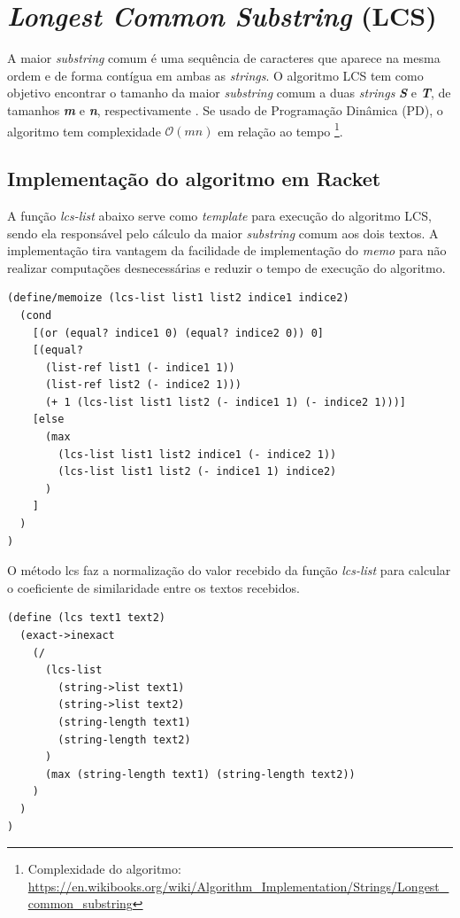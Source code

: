 \documentclass[12pt]{article}
\begin{document}
\newpage

\section{\textit{Longest Common Substring} (LCS)}\label{sec:lcs}

A maior \textit{substring} comum é uma sequência de caracteres que aparece na mesma ordem e de forma contígua em ambas as \textit{strings}. O algoritmo LCS tem como objetivo encontrar o tamanho da maior \textit{substring} comum a duas \textit{strings} \textbf{\textit{S}} e \textbf{\textit{T}}, de tamanhos \textbf{\textit{m}} e \textbf{\textit{n}}, respectivamente \cite{Amir2018LongestCS}. Se usado de Programação Dinâmica (PD), o algoritmo tem complexidade $\mathcal{O}(mn)$ em relação ao tempo \footnote{Complexidade do algoritmo: \url{https://en.wikibooks.org/wiki/Algorithm_Implementation/Strings/Longest_common_substring}}.

\subsection{Implementação do algoritmo em Racket}

A função \textit{lcs-list} abaixo serve como \textit{template} para execução do algoritmo LCS, sendo ela responsável pelo cálculo da maior \textit{substring} comum aos dois textos. A implementação tira vantagem da facilidade de implementação do \textit{memo} para não realizar computações desnecessárias e reduzir o tempo de execução do algoritmo.

\begin{lstlisting}
(define/memoize (lcs-list list1 list2 indice1 indice2)
  (cond 
    [(or (equal? indice1 0) (equal? indice2 0)) 0]
    [(equal? 
      (list-ref list1 (- indice1 1))
      (list-ref list2 (- indice2 1)))
      (+ 1 (lcs-list list1 list2 (- indice1 1) (- indice2 1)))]
    [else
      (max
        (lcs-list list1 list2 indice1 (- indice2 1))
        (lcs-list list1 list2 (- indice1 1) indice2)
      )
    ]
  )
)
\end{lstlisting}

O método lcs faz a normalização do valor recebido da função \textit{lcs-list} para calcular o coeficiente de similaridade entre os textos recebidos.

\begin{lstlisting}
(define (lcs text1 text2)
  (exact->inexact 
    (/ 
      (lcs-list 
        (string->list text1)
        (string->list text2)
        (string-length text1)
        (string-length text2)
      )
      (max (string-length text1) (string-length text2))
    )
  )
)
\end{lstlisting}
\end{document}
